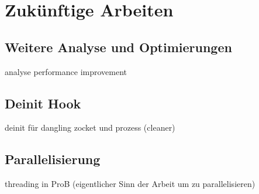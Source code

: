 

\section{Zukünftige Arbeiten}


\subsection{Weitere Analyse und Optimierungen}

    analyse performance improvement

\subsection{Deinit Hook}

 deinit für dangling zocket und prozess (cleaner)

\subsection{Parallelisierung}

 threading in ProB (eigentlicher Sinn der Arbeit um zu parallelisieren)

